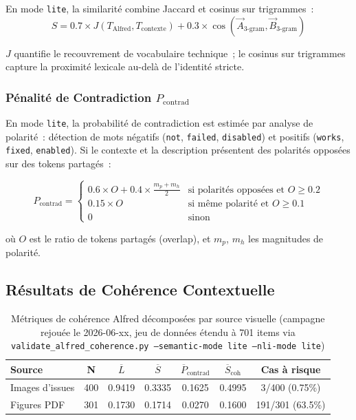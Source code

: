En mode \texttt{lite}, la similarité combine Jaccard et cosinus sur trigrammes~:
\begin{equation}
S = 0.7 \times J(T_{\text{Alfred}}, T_{\text{contexte}}) + 0.3 \times \cos(\vec{A}_{\text{3-gram}}, \vec{B}_{\text{3-gram}})
\label{eq:semantic_lite}
\end{equation}

$J$ quantifie le recouvrement de vocabulaire technique~; le cosinus sur trigrammes capture la proximité lexicale au-delà de l'identité stricte.

\subsubsection{Pénalité de Contradiction $P_{\text{contrad}}$}

En mode \texttt{lite}, la probabilité de contradiction est estimée par analyse de polarité~: détection de mots négatifs (\texttt{not}, \texttt{failed}, \texttt{disabled}) et positifs (\texttt{works}, \texttt{fixed}, \texttt{enabled}). Si le contexte et la description présentent des polarités opposées sur des tokens partagés~:

\begin{equation}
P_{\text{contrad}} = \begin{cases}
0.6 \times O + 0.4 \times \frac{m_p + m_h}{2} & \text{si polarités opposées et } O \geq 0.2 \\
0.15 \times O & \text{si même polarité et } O \geq 0.1 \\
0 & \text{sinon}
\end{cases}
\label{eq:contradiction}
\end{equation}

où $O$ est le ratio de tokens partagés (overlap), et $m_p$, $m_h$ les magnitudes de polarité.

\subsection{Résultats de Cohérence Contextuelle}
\label{sec:alfred_resultats}

\begin{table}[H]
\centering
\begin{tabular}{lcccccc}
\toprule
\textbf{Source} & \textbf{N} & $\overline{L}$ & $\overline{S}$ & $\overline{P}_{\text{contrad}}$ & $\overline{S}_{\text{coh}}$ & \textbf{Cas à risque} \\
\midrule
Images d'issues & 400 & 0.9419 & 0.3335 & 0.1625 & 0.4995 & 3/400 (0.75\%) \\
Figures PDF & 301 & 0.1730 & 0.1714 & 0.0270 & 0.1600 & 191/301 (63.5\%) \\
\bottomrule
\end{tabular}
\caption{Métriques de cohérence Alfred décomposées par source visuelle (campagne rejouée le 2026-06-xx, jeu de données étendu à 701 items via \texttt{validate\_alfred\_coherence.py --semantic-mode lite --nli-mode lite})}
\label{tab:alfred_coherence}
\end{table}

